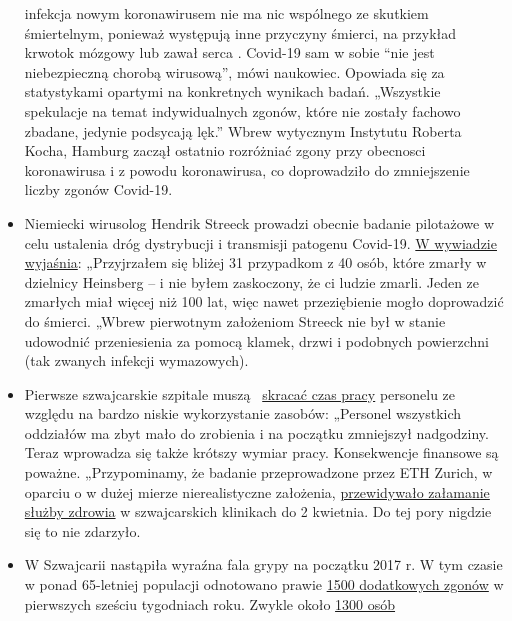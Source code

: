 \begin{itemize}
  infekcja nowym koronawirusem nie ma nic wspólnego ze skutkiem
  śmiertelnym, ponieważ występują inne przyczyny śmierci, na przykład
  krwotok mózgowy lub zawał serca . Covid-19 sam w sobie ``nie jest
  niebezpieczną chorobą wirusową'', mówi naukowiec. Opowiada się za
  statystykami opartymi na konkretnych wynikach badań. „Wszystkie
  spekulacje na temat indywidualnych zgonów, które nie zostały fachowo
  zbadane, jedynie podsycają lęk.'' Wbrew wytycznym Instytutu Roberta
  Kocha, Hamburg zaczął ostatnio rozróżniać zgony przy obecnosci
  koronawirusa i z powodu koronawirusa, co doprowadziło do zmniejszenie
  liczby zgonów Covid-19.
\item
  Niemiecki wirusolog Hendrik Streeck prowadzi obecnie badanie
  pilotażowe w celu ustalenia dróg dystrybucji i transmisji patogenu
  Covid-19.
  \href{https://www.zeit.de/wissen/gesundheit/2020-04/hendrik-streeck-covid-19-heinsberg-symptome-infektionsschutz-massnahmen-studie/komplettansicht}{W
  wywiadzie wyjaśnia}: „Przyjrzałem się bliżej 31 przypadkom z 40 osób,
  które zmarły w dzielnicy Heinsberg -- i nie byłem zaskoczony, że ci
  ludzie zmarli. Jeden ze zmarłych miał więcej niż 100 lat, więc nawet
  przeziębienie mogło doprowadzić do śmierci. „Wbrew pierwotnym
  założeniom Streeck nie był w stanie udowodnić przeniesienia za pomocą
  klamek, drzwi i podobnych powierzchni (tak zwanych infekcji
  wymazowych).
\item
  Pierwsze szwajcarskie szpitale muszą~
  \href{https://www.engadinerpost.ch/2020/4/04/Engadiner-Spitaeler-haben-freie-Kapazitaeten}{skracać
  czas pracy} personelu ze względu na bardzo niskie wykorzystanie
  zasobów: „Personel wszystkich oddziałów ma zbyt mało do zrobienia i na
  początku zmniejszył nadgodziny. Teraz wprowadza się także krótszy
  wymiar pracy. Konsekwencje finansowe są poważne. „Przypominamy, że
  badanie przeprowadzone przez ETH Zurich, w oparciu o w dużej mierze
  nierealistyczne założenia,
  \href{https://www.toponline.ch/news/coronavirus/detail/news/studie-bestaetigt-engpass-bei-spitalbetten-steht-kurz-bevor-00131333/}{przewidywało
  załamanie służby zdrowia} w szwajcarskich klinikach do 2 kwietnia. Do
  tej pory nigdzie się to nie zdarzyło.
\item
  W Szwajcarii nastąpiła wyraźna fala grypy na początku 2017 r. W tym
  czasie w ponad 65-letniej populacji odnotowano prawie
  \href{https://www.srf.ch/news/schweiz/todesursachen-statistik-woran-die-meisten-schweizerinnen-und-schweizer-sterben}{1500
  dodatkowych zgonów} w pierwszych sześciu tygodniach roku. Zwykle około
  \href{https://www.nzz.ch/lungenentzuendung-1.4550285}{1300 osób}

\end{itemize}
